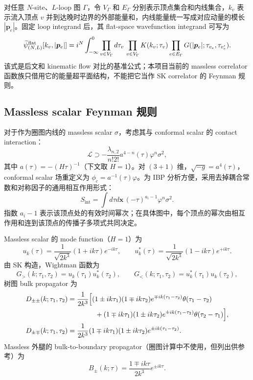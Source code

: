 ﻿\documentclass[a4paper,11pt]{article}
\begin{document}
对任意 $N$-site、$L$-loop 图 $\Gamma$，令 $V_\Gamma$ 和 $E_\Gamma$ 分别表示顶点集合和内线集合，$k_v$ 表示流入顶点 $v$ 并到达晚时边界的外部能量和，内线能量统一写成对应动量的模长 $|\boldsymbol{p}_e|$。固定 loop integrand 后，其 flat-space wavefunction integrand 可写为
\begin{equation}
    \widetilde{\psi}^{\rm flat}_{(N,L)}[k_v,|\boldsymbol{p}_e|]
    =
    i^N\int_{-\infty}^{0}\prod_{v\in V_\Gamma}d\tau_v\,
    \prod_{v\in V_\Gamma}K(k_v;\tau_v)
    \prod_{e\in E_\Gamma}G(|\boldsymbol{p}_e|;\tau_{v_e},\tau_{v'_e}).
    \label{flatwfgen}
\end{equation}
该式是后文和 kinematic flow 对比的基准公式；本项目当前的 massless correlator 函数族只借用它的能量超平面结构，不能把它当作 SK correlator 的 Feynman 规则。

\subsection{Massless scalar Feynman 规则}

对于作为圈图内线的 massless scalar $\sigma$，考虑其与 conformal scalar 的 contact interaction：
\begin{equation}
    \mathcal{L}\supset -\frac{\lambda_{n,2}}{n!2!}a^{4-n}(\tau)\varphi^n\sigma^2,
\end{equation}
其中 $a(\tau)=-(H\tau)^{-1}$（下文取 $H=1$）。对 $(3+1)$ 维，$\sqrt{-g}=a^4(\tau)$，conformal scalar 场重定义为 $\phi_c=a^{-1}(\tau)\varphi$。为 IBP 分析方便，采用去掉耦合常数和对称因子的通用相互作用形式：
\begin{equation}
    S_{\text{int}}=\int d\tau d\boldsymbol{x}\,(-\tau)^{a_i-1}\varphi^n\sigma^2.
\end{equation}
指数 $a_i-1$ 表示该顶点处的有效时间幂次；在具体图中，每个顶点的幂次由相互作用和连到该顶点的传播子多项式共同决定。

Massless scalar 的 mode function（$H=1$）为
\begin{equation}
    u_k(\tau)=\frac{1}{\sqrt{2k^3}}(1+ik\tau)e^{-ik\tau},\qquad
    u_k^*(\tau)=\frac{1}{\sqrt{2k^3}}(1-ik\tau)e^{+ik\tau}.
\end{equation}
由 SK 构造，Wightman 函数为
\begin{equation}
    G_>(k;\tau_1,\tau_2)=u_k(\tau_1)u_k^*(\tau_2),\qquad
    G_<(k;\tau_1,\tau_2)=u_k^*(\tau_1)u_k(\tau_2),
\end{equation}
树图 bulk propagator 为
\begin{align}
D_{\pm\pm}(k;\tau_1,\tau_2)&=\frac{1}{2k^3}\Bigl[(1\pm ik\tau_1)(1\mp ik\tau_2)e^{\mp ik(\tau_1-\tau_2)}\theta(\tau_1-\tau_2)\notag\\
&\qquad\qquad+(1\mp ik\tau_1)(1\pm ik\tau_2)e^{\pm ik(\tau_1-\tau_2)}\theta(\tau_2-\tau_1)\Bigr],\\
D_{\pm\mp}(k;\tau_1,\tau_2)&=\frac{1}{2k^3}(1\mp ik\tau_1)(1\pm ik\tau_2)e^{\pm ik(\tau_1-\tau_2)}.
\end{align}
Massless 外腿的 bulk-to-boundary propagator（圈图计算中不使用，但列出供参考）为
\begin{equation}
    B_{\pm}(k;\tau)=\frac{1\mp ik\tau}{2k^3}e^{\pm ik\tau}.
\end{equation}
\end{document}
